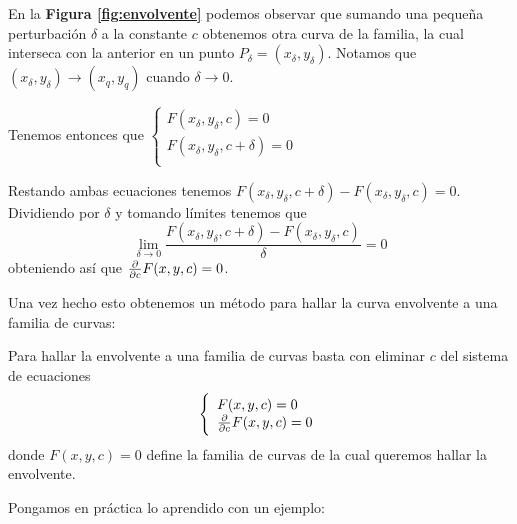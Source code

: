 En la \textbf{Figura \ref{fig:envolvente}} podemos observar que sumando una pequeña perturbación $\delta$ a la constante $c$ obtenemos otra curva de la familia, la cual interseca con la anterior en un punto $P_\delta = (x_\delta, y_\delta)$. Notamos que $(x_\delta, y_\delta) \to (x_q, y_q)$ cuando $\delta \to 0$.

Tenemos entonces que 
$
  \left\lbrace
  \begin{array}{l}
     F(x_\delta, y_\delta, c) = 0 \\
     F(x_\delta, y_\delta, c+\delta) = 0  \\
  \end{array}
  \right.
$

Restando ambas ecuaciones tenemos $F(x_\delta, y_\delta, c+\delta) - F(x_\delta, y_\delta, c) = 0$. Dividiendo por $\delta$ y tomando límites tenemos que $$\lim_{\delta\to 0} \frac{F(x_\delta, y_\delta, c+\delta) - F(x_\delta, y_\delta, c)}{\delta}=0$$ obteniendo así que $\frac{\partial}{\partial c}F(x,y,c) = 0$.

Una vez hecho esto obtenemos un método para hallar la curva envolvente a una familia de curvas:

\begin{method}
Para hallar la envolvente a una familia de curvas basta con eliminar $c$ del sistema de ecuaciones
$$  
  \left\lbrace
  \begin{array}{l}
     F(x, y, c) = 0 \\
     \frac{\partial}{\partial c}F(x, y, c) = 0  \\
  \end{array}
  \right.
$$
donde $F(x,y,c) = 0$ define la familia de curvas de la cual queremos hallar la envolvente.
\end{method}

Pongamos en práctica lo aprendido con un ejemplo:


